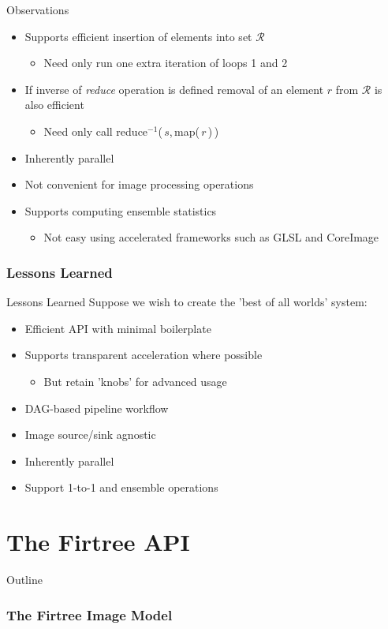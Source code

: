 \documentclass{beamer}
\newcommand{\fancypart}[1]{%
  \part{#1}
  \begin{frame}
    \partpage
  \end{frame}
  \begin{frame}{Outline}
    \tableofcontents
  \end{frame}
}
\newcommand{\bi}{\begin{itemize}}
\newcommand{\ei}{\end{itemize}}
\begin{document}
\begin{frame}{Observations}
  \bi
    \item Supports efficient insertion of elements into set $\mathcal{R}$
    \bi
      \item Need only run one extra iteration of loops 1 and 2
    \ei
    \item If inverse of \emph{reduce} operation is defined removal
    of an element $r$ from $\mathcal{R}$ is also efficient
    \bi
      \item Need only call reduce${}^{-1}$(\,$s$,\,map(\,$r$\,)\,)
    \ei
    \item Inherently parallel
    \item Not convenient for image processing operations
    \item Supports computing ensemble statistics
    \bi
      \item Not easy using accelerated frameworks such as GLSL and CoreImage
    \ei
  \ei
\end{frame}


\section{Lessons Learned} %

\begin{frame}{Lessons Learned}
  Suppose we wish to create the 'best of all worlds' system:
  \bi
    \item Efficient API with minimal boilerplate
    \item Supports transparent acceleration where possible
    \bi
      \item But retain 'knobs' for advanced usage
    \ei
    \item DAG-based pipeline workflow
    \item Image source/sink agnostic
    \item Inherently parallel
    \item Support 1-to-1 and ensemble operations
  \ei
\end{frame}



\fancypart{The Firtree API}

\section{The Firtree Image Model} %
\end{document}
